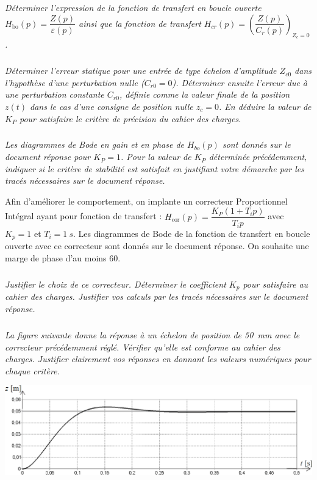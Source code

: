 \documentclass[10pt,fleqn]{article} %
\begin{document}
\begin{multicols}{2}
\subparagraph{}\textit{Déterminer l’expression de la fonction de transfert en boucle ouverte $H_{\text{bo}}(p)=\dfrac{Z(p)}{\varepsilon(p)}$ ainsi que la fonction de transfert  $H_{cr}(p)=
\left(\dfrac{Z(p)}{C_r(p)}\right)_{Z_c=0}$.}


\subparagraph{}\textit{Déterminer l’erreur statique pour une entrée de type échelon d’amplitude $Z_{c0}$ dans l’hypothèse d’une perturbation nulle ($C_{r0}=0$). Déterminer ensuite l’erreur due à une
perturbation constante $C_{r0}$, définie comme la valeur finale de la position $z(t)$ dans le cas d’une
consigne de position nulle $z_c= 0$. En déduire la valeur de $K_P$ pour satisfaire le critère de
précision du cahier des charges.}

\subparagraph{}\textit{Les diagrammes de Bode en gain et en phase de $H_{bo}(p)$ sont donnés sur le document réponse pour $K_P=1$. Pour la valeur de $K_P$ déterminée précédemment, indiquer si le critère de stabilité est satisfait en justifiant votre démarche par les tracés nécessaires sur le document
réponse.}

Afin d’améliorer le comportement, on implante un correcteur Proportionnel Intégral ayant pour
fonction de transfert : $H_{\text{cor}}(p)=\dfrac{K_P\left(1+T_i p\right)}{T_i p}$ avec $K_p=1$ et $T_i=\SI{1}{s}$.
Les diagrammes de Bode de la fonction de transfert en boucle ouverte avec ce correcteur sont
donnés sur le document réponse.
On souhaite une marge de phase d’au moins 60\degres.


\subparagraph{}\textit{Justifier le choix de ce correcteur. Déterminer le coefficient $K_p$ pour satisfaire au cahier des charges. Justifier vos calculs par les tracés nécessaires sur le document réponse.}%

\subparagraph{}\textit{La figure suivante donne la réponse à un échelon de position de \SI{50}{mm} avec le correcteur précédemment réglé. Vérifier qu’elle est conforme au cahier des charges. Justifier clairement vos réponses en donnant les valeurs numériques pour chaque critère.}


\begin{center}
\includegraphics[width=\linewidth]{images/ccp_12}
\end{center}

\end{multicols}
\end{document}

